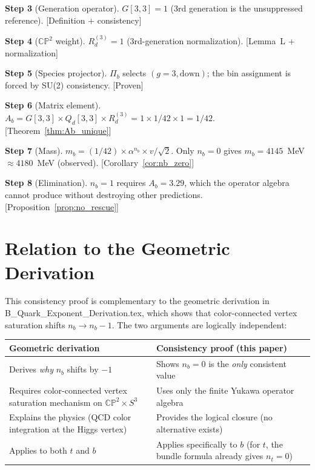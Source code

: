 \documentclass[11pt,a4paper]{article}
\newcommand{\CP}{\mathbb{CP}}
\theoremstyle{definition}
\theoremstyle{remark}
\begin{document}
\noindent
\textbf{Step 3} (Generation operator).
$G[3,3] = 1$ (3rd generation is the unsuppressed reference).
\hfill {\color{proven}[Definition + consistency]}

\medskip

\noindent
\textbf{Step 4} ($\CP^2$ weight).
$R_d^{(3)} = 1$ (3rd-generation normalization).
\hfill {\color{proven}[Lemma~L + normalization]}

\medskip

\noindent
\textbf{Step 5} (Species projector).
$\Pi_b$ selects $(g = 3, \text{down})$; the bin assignment is forced by
SU(2) consistency.
\hfill {\color{proven}[Proven]}

\medskip

\noindent
\textbf{Step 6} (Matrix element).
$A_b = G[3,3] \times Q_d[3,3] \times R_d^{(3)} = 1 \times 1/42 \times 1 = 1/42$.
\hfill {\color{proven}[Theorem~\ref{thm:Ab_unique}]}

\medskip

\noindent
\textbf{Step 7} (Mass).
$m_b = (1/42) \times \alpha^{n_b} \times v/\sqrt{2}$.
Only $n_b = 0$ gives $m_b = 4145$~MeV $\approx 4180$~MeV (observed).
\hfill {\color{proven}[Corollary~\ref{cor:nb_zero}]}

\medskip

\noindent
\textbf{Step 8} (Elimination).
$n_b = 1$ requires $A_b = 3.29$, which the operator algebra cannot produce
without destroying other predictions.
\hfill {\color{proven}[Proposition~\ref{prop:no_rescue}]}

\section{Relation to the Geometric Derivation}
\label{sec:relation}

This consistency proof is complementary to the geometric derivation in
B\_Quark\_Exponent\_Derivation.tex, which shows that color-connected
vertex saturation shifts $n_b \to n_b - 1$.  The two arguments are
logically independent:

\begin{center}
\renewcommand{\arraystretch}{1.4}
\begin{tabular}{p{6cm}p{6cm}}
\toprule
\textbf{Geometric derivation} & \textbf{Consistency proof (this paper)} \\
\midrule
Derives \emph{why} $n_b$ shifts by $-1$ & Shows $n_b = 0$ is the \emph{only}
consistent value \\
Requires color-connected vertex saturation mechanism on $\CP^2 \times S^3$ &
Uses only the finite Yukawa operator algebra \\
Explains the physics (QCD color integration at the Higgs vertex) &
Provides the logical closure (no alternative exists) \\
Applies to both $t$ and $b$ & Applies specifically to $b$ (for $t$, the
bundle formula already gives $n_t = 0$) \\
\bottomrule
\end{tabular}
\end{center}
\end{document}
